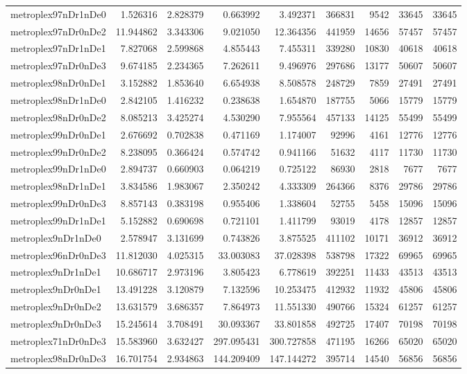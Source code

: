 \begin{longtable}{|l|r|r|r|r|r|r|r|r|}
metroplex97nDr1nDe0 & 1.526316 & 2.828379 & 0.663992 & 3.492371 & 366831 & 9542 & 33645 & 33645 \\
metroplex97nDr0nDe2 & 11.944862 & 3.343306 & 9.021050 & 12.364356 & 441959 & 14656 & 57457 & 57457 \\
metroplex97nDr1nDe1 & 7.827068 & 2.599868 & 4.855443 & 7.455311 & 339280 & 10830 & 40618 & 40618 \\
metroplex97nDr0nDe3 & 9.674185 & 2.234365 & 7.262611 & 9.496976 & 297686 & 13177 & 50607 & 50607 \\
metroplex98nDr0nDe1 & 3.152882 & 1.853640 & 6.654938 & 8.508578 & 248729 & 7859 & 27491 & 27491 \\
metroplex98nDr1nDe0 & 2.842105 & 1.416232 & 0.238638 & 1.654870 & 187755 & 5066 & 15779 & 15779 \\
metroplex98nDr0nDe2 & 8.085213 & 3.425274 & 4.530290 & 7.955564 & 457133 & 14125 & 55499 & 55499 \\
metroplex99nDr0nDe1 & 2.676692 & 0.702838 & 0.471169 & 1.174007 & 92996 & 4161 & 12776 & 12776 \\
metroplex99nDr0nDe2 & 8.238095 & 0.366424 & 0.574742 & 0.941166 & 51632 & 4117 & 11730 & 11730 \\
metroplex99nDr1nDe0 & 2.894737 & 0.660903 & 0.064219 & 0.725122 & 86930 & 2818 & 7677 & 7677 \\
metroplex98nDr1nDe1 & 3.834586 & 1.983067 & 2.350242 & 4.333309 & 264366 & 8376 & 29786 & 29786 \\
metroplex99nDr0nDe3 & 8.857143 & 0.383198 & 0.955406 & 1.338604 & 52755 & 5458 & 15096 & 15096 \\
metroplex99nDr1nDe1 & 5.152882 & 0.690698 & 0.721101 & 1.411799 & 93019 & 4178 & 12857 & 12857 \\
metroplex9nDr1nDe0 & 2.578947 & 3.131699 & 0.743826 & 3.875525 & 411102 & 10171 & 36912 & 36912 \\
metroplex96nDr0nDe3 & 11.812030 & 4.025315 & 33.003083 & 37.028398 & 538798 & 17322 & 69965 & 69965 \\
metroplex9nDr1nDe1 & 10.686717 & 2.973196 & 3.805423 & 6.778619 & 392251 & 11433 & 43513 & 43513 \\
metroplex9nDr0nDe1 & 13.491228 & 3.120879 & 7.132596 & 10.253475 & 412932 & 11932 & 45806 & 45806 \\
metroplex9nDr0nDe2 & 13.631579 & 3.686357 & 7.864973 & 11.551330 & 490766 & 15324 & 61257 & 61257 \\
metroplex9nDr0nDe3 & 15.245614 & 3.708491 & 30.093367 & 33.801858 & 492725 & 17407 & 70198 & 70198 \\
metroplex71nDr0nDe3 & 15.583960 & 3.632427 & 297.095431 & 300.727858 & 471195 & 16266 & 65020 & 65020 \\
metroplex98nDr0nDe3 & 16.701754 & 2.934863 & 144.209409 & 147.144272 & 395714 & 14540 & 56856 & 56856 \\
\end{longtable}
